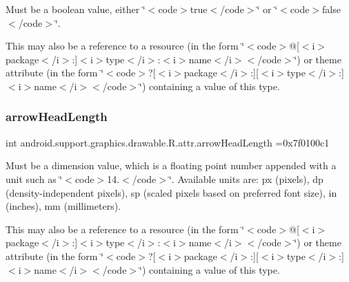 Must be a boolean value, either \char`\"{}$<$code$>$true$<$/code$>$\char`\"{} or \char`\"{}$<$code$>$false$<$/code$>$\char`\"{}. 

This may also be a reference to a resource (in the form \char`\"{}$<$code$>$@\mbox{[}$<$i$>$package$<$/i$>$\+:\mbox{]}$<$i$>$type$<$/i$>$\+:$<$i$>$name$<$/i$>$$<$/code$>$\char`\"{}) or theme attribute (in the form \char`\"{}$<$code$>$?\mbox{[}$<$i$>$package$<$/i$>$\+:\mbox{]}\mbox{[}$<$i$>$type$<$/i$>$\+:\mbox{]}$<$i$>$name$<$/i$>$$<$/code$>$\char`\"{}) containing a value of this type. \mbox{\label{classandroid_1_1support_1_1graphics_1_1drawable_1_1R_1_1attr_a7ad450754990790af89371c72ef6304b}} 
\subsubsection{\texorpdfstring{arrow\+Head\+Length}{arrowHeadLength}}
{\footnotesize\ttfamily int android.\+support.\+graphics.\+drawable.\+R.\+attr.\+arrow\+Head\+Length =0x7f0100c1\hspace{0.3cm}{\ttfamily [static]}}

Must be a dimension value, which is a floating point number appended with a unit such as \char`\"{}$<$code$>$14.\+5sp$<$/code$>$\char`\"{}. Available units are\+: px (pixels), dp (density-\/independent pixels), sp (scaled pixels based on preferred font size), in (inches), mm (millimeters). 

This may also be a reference to a resource (in the form \char`\"{}$<$code$>$@\mbox{[}$<$i$>$package$<$/i$>$\+:\mbox{]}$<$i$>$type$<$/i$>$\+:$<$i$>$name$<$/i$>$$<$/code$>$\char`\"{}) or theme attribute (in the form \char`\"{}$<$code$>$?\mbox{[}$<$i$>$package$<$/i$>$\+:\mbox{]}\mbox{[}$<$i$>$type$<$/i$>$\+:\mbox{]}$<$i$>$name$<$/i$>$$<$/code$>$\char`\"{}) containing a value of this type. \mbox{\label{classandroid_1_1support_1_1graphics_1_1drawable_1_1R_1_1attr_a0ec9882575ed72af51458776aee071c5}} 
